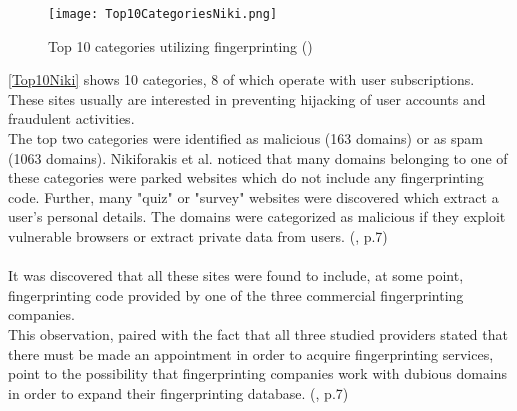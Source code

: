 \begin{figure}[H]
\centering
		\texttt{[image: Top10CategoriesNiki.png]}
		\caption{Top 10 categories utilizing fingerprinting (\textcite{Top10Niki})}
		\label{Top10Niki}
\end{figure}
\autoref{Top10Niki} shows 10 categories, 8 of which operate with user subscriptions. These sites usually are interested in preventing hijacking of user accounts and fraudulent activities.\\
The top two categories were identified as malicious (163 domains) or as spam (1063 domains). Nikiforakis et al. noticed that many domains belonging to one of these categories were parked websites which do not include any fingerprinting code. Further, many "quiz" or "survey" websites were discovered which extract a user's personal details. The domains were categorized as malicious if they exploit vulnerable browsers or extract private data from users. (\textcite{nikiforakis13}, p.7)\\\\
It was discovered that all these sites were found to include, at some point, fingerprinting code provided by one of the three commercial fingerprinting companies.\\
This observation, paired with the fact that all three studied providers stated that there must be made an appointment in order to acquire fingerprinting services, point to the possibility that fingerprinting companies work with dubious domains in order to expand their fingerprinting database. (\textcite{nikiforakis13}, p.7)


